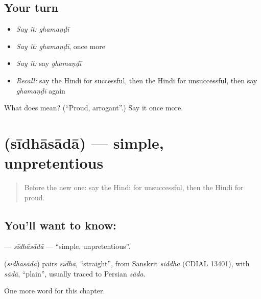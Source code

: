 \subsection*{Your turn}
\begin{itemize}
\raggedright
  \item \emph{Say it:} \emph{ghamaṇḍī}
  \item \emph{Say it:} \emph{ghamaṇḍī}, once more
  \item \emph{Say it:} say \emph{ghamaṇḍī}
  \item \emph{Recall:} say the Hindi for successful, then the Hindi for unsuccessful, then say \emph{ghamaṇḍī} again
\end{itemize}

\begin{tcolorbox}[breakable,colback=teal!4,colframe=teal!35!black,title={Before you move on}]
What does  mean? (\textquotedblleft{}Proud, arrogant\textquotedblright{}.) Say it once more.
\end{tcolorbox}
\section[\texorpdfstring{\hi{सीधासादा} (sīdhāsādā)}{सीधासादा (sīdhāsādā)}]{ (sīdhāsādā) — simple, unpretentious}

\label{lesson:HI-C243-sidhasada}



\begin{quote}
Before the new one: say the Hindi for unsuccessful, then the Hindi for proud.
\end{quote}

\subsection*{You'll want to know: }
\textbf{} — \emph{sīdhāsādā} — \textquotedblleft{}simple, unpretentious\textquotedblright{}.

\begin{cousinweb}
\textbf{} (\emph{sīdhāsādā}) pairs \emph{sīdhā}, \textquotedblleft{}straight\textquotedblright{}, from Sanskrit \emph{siddha} (CDIAL 13401), with \emph{sādā}, \textquotedblleft{}plain\textquotedblright{}, usually traced to Persian \emph{sāda}.
\end{cousinweb}

\begin{grammarlens}[title={What you've built}]
One more word for this chapter.
\end{grammarlens}

